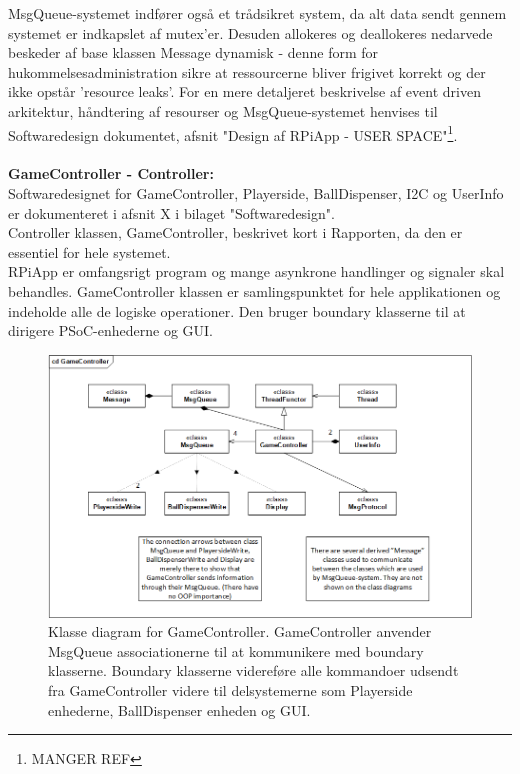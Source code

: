 \documentclass[Rapport/Rapport_main.tex]{subfiles}
\begin{document}
MsgQueue-systemet indfører også et trådsikret system, da alt data sendt gennem systemet er indkapslet af mutex'er. Desuden allokeres og deallokeres nedarvede beskeder af base klassen Message dynamisk - denne form for hukommelsesadministration sikre at ressourcerne bliver frigivet korrekt og der ikke opstår 'resource leaks'. For en mere detaljeret beskrivelse af event driven arkitektur, håndtering af resourser og MsgQueue-systemet henvises til Softwaredesign dokumentet, afsnit "Design af RPiApp - USER SPACE"\footnote{MANGER REF}.\\\\
\textbf{GameController - Controller:}\\
Softwaredesignet for GameController, Playerside, BallDispenser, I2C og UserInfo er dokumenteret i afsnit X i bilaget "Softwaredesign". \\
Controller klassen, GameController, beskrivet kort i Rapporten, da den er essentiel for hele systemet. \\
RPiApp er omfangsrigt program og mange asynkrone handlinger og signaler skal behandles. GameController klassen er samlingspunktet for hele applikationen og indeholde alle de logiske operationer. Den bruger boundary klasserne til at dirigere PSoC-enhederne og GUI.
\begin{figure}[H]
    \centering
    \includegraphics[width=1\textwidth]{Rapport/RPi/graphics/GameController.png}
    \caption{Klasse diagram for GameController. GameController anvender MsgQueue associationerne til at kommunikere med boundary klasserne. Boundary klasserne videreføre alle kommandoer udsendt fra GameController videre til delsystemerne som Playerside enhederne, BallDispenser enheden og GUI.}
   \label{fig:cd_GameController}
\end{figure}
\end{document}
